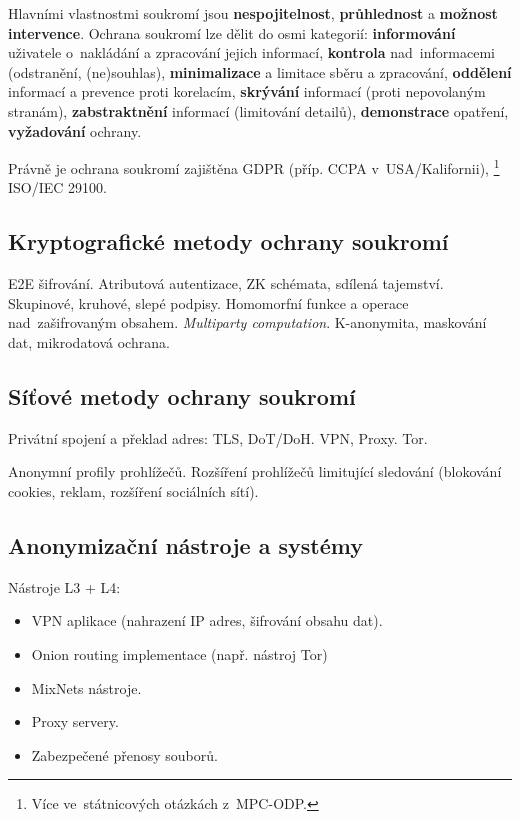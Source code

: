 Hlavními vlastnostmi soukromí jsou \textbf{nespojitelnost}, \textbf{průhlednost} a \textbf{možnost intervence}.
Ochrana soukromí lze dělit do osmi kategorií:
\textbf{informování} uživatele o~nakládání a zpracování jejich informací, \textbf{kontrola} nad~informacemi (odstranění, (ne)souhlas), \textbf{minimalizace} a limitace sběru a zpracování, \textbf{oddělení} informací a prevence proti korelacím, \textbf{skrývání} informací (proti nepovolaným stranám), \textbf{zabstraktnění} informací (limitování detailů), \textbf{demonstrace} opatření, \textbf{vyžadování} ochrany.

Právně je ochrana soukromí zajištěna GDPR (příp. CCPA v~USA/Kalifornii),%
\footnote{Více ve~státnicových otázkách z~MPC-ODP.}
ISO/IEC 29100.


\subsection{Kryptografické metody ochrany soukromí}

E2E šifrování.
Atributová autentizace, ZK schémata, sdílená tajemství.
Skupinové, kruhové, slepé podpisy.
Homomorfní funkce a operace nad~zašifrovaným obsahem.
\emph{Multiparty computation}.
K-anonymita, maskování dat, mikrodatová ochrana.


\subsection{Síťové metody ochrany soukromí}

Privátní spojení a překlad adres: TLS, DoT/DoH.
VPN, Proxy.
Tor.

Anonymní profily prohlížečů.
Rozšíření prohlížečů limitující sledování (blokování cookies, reklam, rozšíření sociálních sítí).

\subsection{Anonymizační nástroje a systémy}

Nástroje L3 + L4:
\vspace*{-0.5em}\begin{itemize}
    \item VPN aplikace (nahrazení IP adres, šifrování obsahu dat).
    \item Onion routing implementace (např. nástroj Tor)
    \item MixNets nástroje.
    \item Proxy servery.
    \item Zabezpečené přenosy souborů.
\end{itemize}

